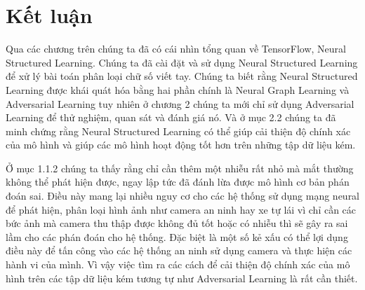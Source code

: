 
\chapter{Kết luận} %

\label{Chapter3} %

Qua các chương trên chúng ta đã có cái nhìn tổng quan về TensorFlow, Neural Structured Learning. Chúng ta đã cài đặt và sử dụng  Neural Structured Learning
để xử lý bài toán phân loại chữ số viết tay. Chúng ta biết rằng Neural Structured Learning được khái quát hóa bằng hai phần chính là Neural Graph Learning và
Adversarial Learning tuy nhiên ở chương 2 chúng ta mới chỉ sử dụng Adversarial Learning để thử nghiệm, quan sát và đánh giá nó. Và ở mục 2.2 chúng ta đã minh chứng 
rằng Neural Structured Learning có thể giúp cải thiện độ chính xác của mô hình và giúp các mô hình hoạt động tốt hơn trên những tập dữ liệu kém.

Ở mục 1.1.2 chúng ta thấy rằng chỉ cần thêm một nhiễu rất nhỏ mà mắt thường không thể phát hiện được, ngay lập tức đã đánh lừa được mô hình cơ bản phán đoán sai.
Điều này mang lại nhiều nguy cơ cho các hệ thống sử dụng mạng neural để phát hiện, phân loại hình ảnh như camera an ninh hay xe tự lái vì chỉ cần các bức ảnh mà camera
thu thập được không đủ tốt hoặc có nhiễu thì sẽ gây ra sai lầm cho các phán đoán cho hệ thống. Đặc biệt là một số kẻ xấu có thể lợi dụng điều này để tấn công vào các hệ thống an ninh sử dụng
camera và thực hiện các hành vi của mình. Vì vậy việc tìm ra các cách để cải thiện độ chính xác của mô hình trên các tập dữ liệu kém tương tự như Adversarial Learning là rất cần thiết.